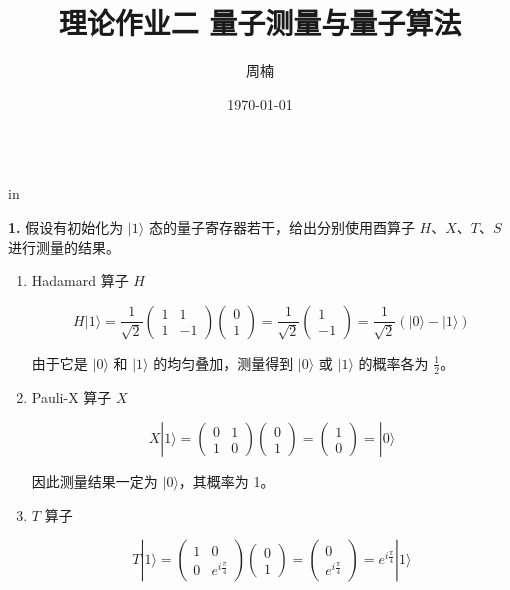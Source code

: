 \documentclass[11pt]{article}
\begin{document}
\title{{\bf 理论作业二 \quad 量子测量与量子算法}}
\author{周楠 }
\date{\today}
\maketitle

\begin{tabular*}{13cm}{r}
\hline
\end{tabular*}

 in

{\bf 1.} 假设有初始化为 $|1\rangle$ 态的量子寄存器若干，给出分别使用酉算子 $H$、$X$、$T$、$S$ 进行测量的结果。

\begin{enumerate}   
    \item Hadamard 算子 \( H \)
    
    \[
    H |1\rangle = \frac{1}{\sqrt{2}} \begin{pmatrix} 1 & 1 \\ 1 & -1 \end{pmatrix} \begin{pmatrix} 0 \\ 1 \end{pmatrix} = \frac{1}{\sqrt{2}} \begin{pmatrix} 1 \\ -1 \end{pmatrix}
    = \frac{1}{\sqrt{2}} (|0\rangle - |1\rangle)
    \]

    由于它是 \( |0\rangle \) 和 \( |1\rangle \) 的均匀叠加，测量得到 \( |0\rangle \) 或 \( |1\rangle \) 的概率各为 \( \frac{1}{2} \)。


    \item Pauli-X 算子 \( X \)


    \[
    X |1\rangle = \begin{pmatrix} 0 & 1 \\ 1 & 0 \end{pmatrix} \begin{pmatrix} 0 \\ 1 \end{pmatrix} = \begin{pmatrix} 1 \\ 0 \end{pmatrix} = |0\rangle
    \]

    因此测量结果一定为 \( |0\rangle \)，其概率为 1。

    \item \( T \) 算子
    

    \[
    T |1\rangle = \begin{pmatrix} 1 & 0 \\ 0 & e^{i\frac{\pi}{4}} \end{pmatrix} \begin{pmatrix} 0 \\ 1 \end{pmatrix} = \begin{pmatrix} 0 \\ e^{i\frac{\pi}{4}} \end{pmatrix} = e^{i\frac{\pi}{4}} |1\rangle
    \]


\end{enumerate}
\end{document}
